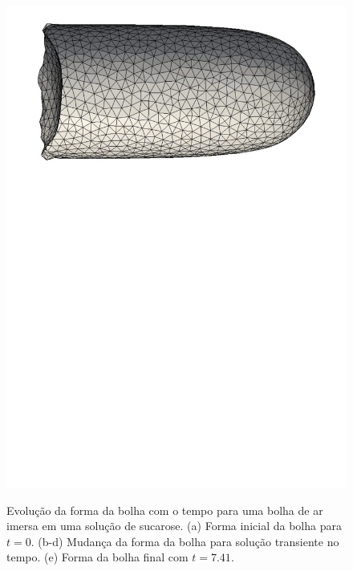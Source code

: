 \documentclass[a4paper,portuges,12pt]{article}
\begin{document}
\begin{figure}[h!]
\begin{center}
			{\includegraphics[angle=90,scale=0.29]{figs/sucrose-5.pdf}}
 	\end{center}
	\caption{Evolução da forma da bolha com o tempo para uma bolha de ar
	imersa em uma solução de sucarose. (a) Forma inicial da bolha para
	$t=0$. (b-d) Mudança da forma da bolha para solução transiente no
	tempo. (e) Forma da bolha final com $t=7.41$.} 
	\label{fig:sucrose} 
 \end{figure}
\end{document}

